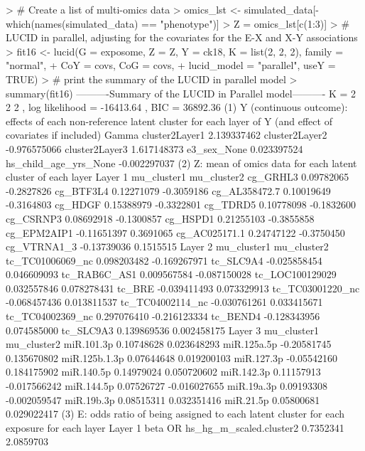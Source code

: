 \begin{example}
> # Create a list of multi-omics data
> omics_lst <- simulated_data[-which(names(simulated_data) == "phenotype")]
> Z = omics_lst[c(1:3)]
> # LUCID in parallel, adjusting for the covariates for the E-X and X-Y associations
> fit16 <- lucid(G = exposome, Z = Z, Y = ck18, K = list(2, 2, 2), family = "normal",
+                CoY = covs, CoG = covs,
+                lucid_model = "parallel", useY = TRUE)
> # print the summary of the LUCID in parallel model
> summary(fit16)
----------Summary of the LUCID in Parallel model----------
K =  2 2 2 , log likelihood = -16413.64 , BIC =  36892.36
(1) Y (continuous outcome): effects of each non-reference latent cluster
    for each layer of Y
(and effect of covariates if included)
                             Gamma
cluster2Layer1         2.139337462
cluster2Layer2        -0.976575066
cluster2Layer3         1.617148373
e3_sex_None            0.023397524
hs_child_age_yrs_None -0.002297037
(2) Z: mean of omics data for each latent cluster of each layer
Layer  1
              mu_cluster1 mu_cluster2
cg_GRHL3       0.09782065  -0.2827826
cg_BTF3L4      0.12271079  -0.3059186
cg_AL358472.7  0.10019649  -0.3164803
cg_HDGF        0.15388979  -0.3322801
cg_TDRD5       0.10778098  -0.1832600
cg_CSRNP3      0.08692918  -0.1300857
cg_HSPD1       0.21255103  -0.3855858
cg_EPM2AIP1   -0.11651397   0.3691065
cg_AC025171.1  0.24747122  -0.3750450
cg_VTRNA1_3   -0.13739036   0.1515515
Layer  2
                  mu_cluster1  mu_cluster2
tc_TC01006069_nc  0.098203482 -0.169267971
tc_SLC9A4        -0.025858454  0.046609093
tc_RAB6C_AS1      0.009567584 -0.087150028
tc_LOC100129029   0.032557846  0.078278431
tc_BRE           -0.039411493  0.073329913
tc_TC03001220_nc -0.068457436  0.013811537
tc_TC04002114_nc -0.030761261  0.033415671
tc_TC04002369_nc  0.297076410 -0.216123334
tc_BEND4         -0.128343956  0.074585000
tc_SLC9A3         0.139869536  0.002458175
Layer  3
              mu_cluster1  mu_cluster2
miR.101.3p     0.10748628  0.023648293
miR.125a.5p   -0.20581745  0.135670802
miR.125b.1.3p  0.07644648  0.019200103
miR.127.3p    -0.05542160  0.184175902
miR.140.5p     0.14979024  0.050720602
miR.142.3p     0.11157913 -0.017566242
miR.144.5p     0.07526727 -0.016027655
miR.19a.3p     0.09193308 -0.002059547
miR.19b.3p     0.08515311  0.032351416
miR.21.5p      0.05800681  0.029022417
(3) E: odds ratio of being assigned to each latent cluster for each exposure
    for each layer
Layer  1
                                     beta        OR
hs_hg_m_scaled.cluster2         0.7352341 2.0859703

\end{example}

